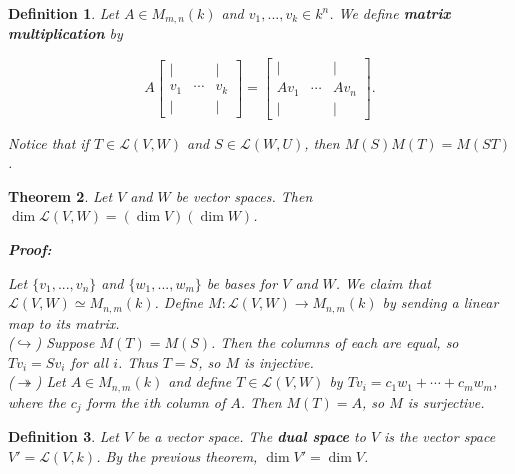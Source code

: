 \documentclass{article}
\theoremstyle{colontheorem}
\newtheorem{theorem}{Theorem}[section]
\newtheorem{definition}[theorem]{Definition}
\newenvironment{Theorem}
{
	\begin{mdframed}[backgroundcolor=TheoremOrange!10]
	\begin{theorem}
}
{
	\end{theorem}
	\end{mdframed}
	
	\vspace{.15in}
}
\newenvironment{Def}
{
	\begin{mdframed}[backgroundcolor=DefGreen!10]
	\begin{definition}
}
{
	\end{definition}
	\end{mdframed}
	
	\vspace{.15in}
}
\newenvironment{Proof}
{
	\begin{mdframed}[backgroundcolor=ProofPurple!10]
	\textbf{Proof:}%
}
{
	\end{mdframed}
	
	\vspace{.085in}
}
\begin{document}
\begin{Def}
	
	Let $A \in M_{m, n}(k)$ and $v_1, ..., v_k \in k^n$. We define \textbf{matrix multiplication} by
	
	$$
	A \begin{bmatrix}
	
	| &   & |\\
	v_1 & \cdots & v_k\\
	| &   & |
	
	\end{bmatrix} = \begin{bmatrix}
	
	| &   & |\\
	Av_1 & \cdots & Av_n\\
	| &   & |
	
	\end{bmatrix}.
	$$
	
	Notice that if $T \in \mathcal{L}(V,W)$ and $S \in \mathcal{L}(W,U)$, then $M(S) M(T) = M(ST)$.
	
\end{Def}




\begin{Theorem}
	
	Let $V$ and $W$ be vector spaces. Then $\dim \mathcal{L}(V,W) = (\dim V)(\dim W)$.
	
	\begin{Proof}
		Let $\{v_1, ..., v_n\}$ and $\{w_1, ..., w_m\}$ be bases for $V$ and $W$. We claim that $\mathcal{L}(V,W) \simeq M_{n, m}(k)$. Define $M : \mathcal{L}(V,W) \longrightarrow M_{n, m}(k)$ by sending a linear map to its matrix.\\
		
		($\hookrightarrow$) Suppose $M(T) = M(S)$. Then the columns of each are equal, so $Tv_i = Sv_i$ for all $i$. Thus $T = S$, so $M$ is injective.\\
		
		($\twoheadrightarrow$) Let $A \in M_{n, m}(k)$ and define $T \in \mathcal{L}(V,W)$ by $Tv_i = c_1 w_1 + \cdots + c_m w_m$, where the $c_j$ form the $i$th column of $A$. Then $M(T) = A$, so $M$ is surjective.
		
	\end{Proof}
	
\end{Theorem}



\begin{Def}
	
	Let $V$ be a vector space. The \textbf{dual space} to $V$ is the vector space $V' = \mathcal{L}(V, k)$. By the previous theorem, $\dim V' = \dim V$.
	
\end{Def}
\end{document}
